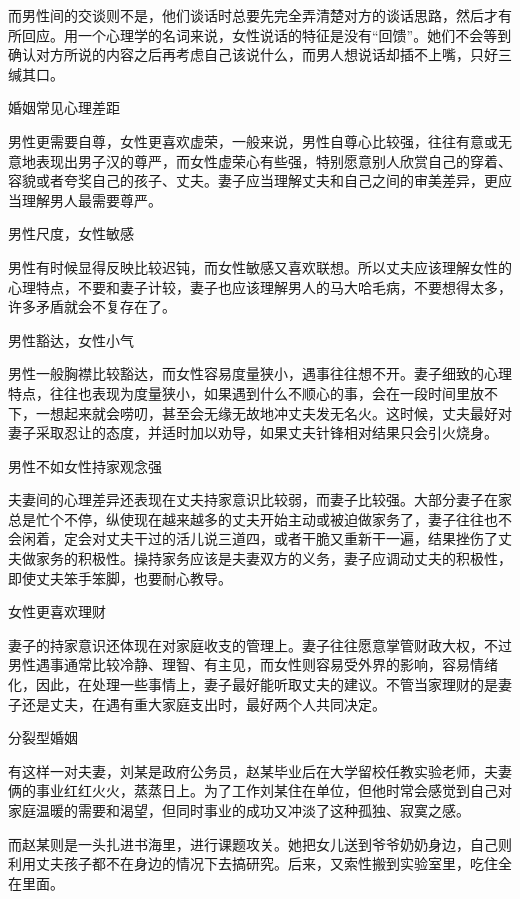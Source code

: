 \documentclass[12pt,UTF8]{ctexbook}
\begin{document}
而男性间的交谈则不是，他们谈话时总要先完全弄清楚对方的谈话思路，然后才有所回应。用一个心理学的名词来说，女性说话的特征是没有“回馈”。她们不会等到确认对方所说的内容之后再考虑自己该说什么，而男人想说话却插不上嘴，只好三缄其口。





婚姻常见心理差距


男性更需要自尊，女性更喜欢虚荣，一般来说，男性自尊心比较强，往往有意或无意地表现出男子汉的尊严，而女性虚荣心有些强，特别愿意别人欣赏自己的穿着、容貌或者夸奖自己的孩子、丈夫。妻子应当理解丈夫和自己之间的审美差异，更应当理解男人最需要尊严。

男性尺度，女性敏感

男性有时候显得反映比较迟钝，而女性敏感又喜欢联想。所以丈夫应该理解女性的心理特点，不要和妻子计较，妻子也应该理解男人的马大哈毛病，不要想得太多，许多矛盾就会不复存在了。

男性豁达，女性小气

男性一般胸襟比较豁达，而女性容易度量狭小，遇事往往想不开。妻子细致的心理特点，往往也表现为度量狭小，如果遇到什么不顺心的事，会在一段时间里放不下，一想起来就会唠叨，甚至会无缘无故地冲丈夫发无名火。这时候，丈夫最好对妻子采取忍让的态度，并适时加以劝导，如果丈夫针锋相对结果只会引火烧身。

男性不如女性持家观念强

夫妻间的心理差异还表现在丈夫持家意识比较弱，而妻子比较强。大部分妻子在家总是忙个不停，纵使现在越来越多的丈夫开始主动或被迫做家务了，妻子往往也不会闲着，定会对丈夫干过的活儿说三道四，或者干脆又重新干一遍，结果挫伤了丈夫做家务的积极性。操持家务应该是夫妻双方的义务，妻子应调动丈夫的积极性，即使丈夫笨手笨脚，也要耐心教导。

女性更喜欢理财

妻子的持家意识还体现在对家庭收支的管理上。妻子往往愿意掌管财政大权，不过男性遇事通常比较冷静、理智、有主见，而女性则容易受外界的影响，容易情绪化，因此，在处理一些事情上，妻子最好能听取丈夫的建议。不管当家理财的是妻子还是丈夫，在遇有重大家庭支出时，最好两个人共同决定。





分裂型婚姻


有这样一对夫妻，刘某是政府公务员，赵某毕业后在大学留校任教实验老师，夫妻俩的事业红红火火，蒸蒸日上。为了工作刘某住在单位，但他时常会感觉到自己对家庭温暖的需要和渴望，但同时事业的成功又冲淡了这种孤独、寂寞之感。

而赵某则是一头扎进书海里，进行课题攻关。她把女儿送到爷爷奶奶身边，自己则利用丈夫孩子都不在身边的情况下去搞研究。后来，又索性搬到实验室里，吃住全在里面。
\end{document}
